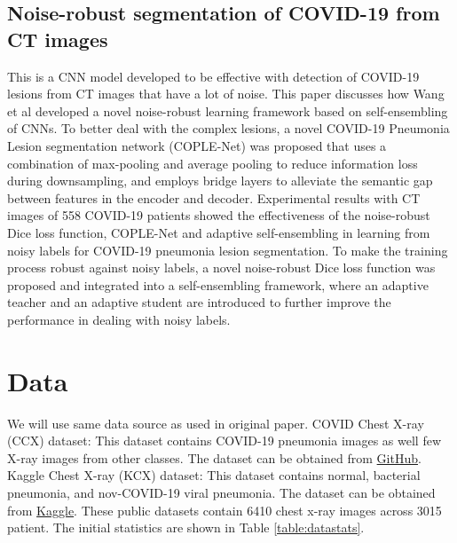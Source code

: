 \documentclass{sigkddExp}
\begin{document}
\subsection{Noise-robust segmentation of COVID-19 from CT images}

This is a CNN model \cite{wang2020covidnet} developed to be effective with
detection of COVID-19 lesions from CT images that have a lot of noise. This
paper discusses how Wang et al developed a novel noise-robust learning framework
based on self-ensembling of CNNs.  To better deal with the complex lesions, a
novel COVID-19 Pneumonia Lesion segmentation network (COPLE-Net) was proposed
that uses a combination of max-pooling and average pooling to reduce information
loss during downsampling, and employs bridge layers to alleviate the semantic
gap between features in the encoder and decoder. Experimental results with CT
images of 558 COVID-19 patients showed the effectiveness of the noise-robust
Dice loss function, COPLE-Net and adaptive self-ensembling in learning from
noisy labels for COVID-19 pneumonia lesion segmentation. To make the training
process robust against noisy labels, a novel noise-robust Dice loss function was
proposed and integrated into a self-ensembling framework, where an adaptive
teacher and an adaptive student are introduced to further improve the
performance in dealing with noisy labels.

%

\section{Data}

We will use same data source as used in original paper. COVID Chest X-ray
(CCX) dataset: This dataset contains COVID-19 pneumonia images as well few X-ray
images from other classes. The dataset can be obtained from
\href{https://github.com/ieee8023/covid-chestxray-dataset}{GitHub}.
Kaggle Chest X-ray (KCX) dataset: This dataset contains normal, bacterial
pneumonia, and nov-COVID-19 viral pneumonia. The dataset can be
obtained from \href{https://www.kaggle.com/paultimothymooney/chest-xray-pneumonia}{Kaggle}.
These public datasets contain 6410 chest x-ray images across 3015 patient. The initial
statistics are shown in Table \ref{table:datastats}.
\end{document}
